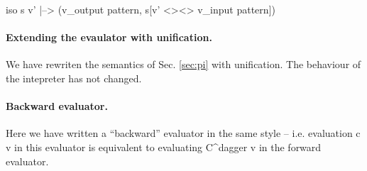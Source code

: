 \documentclass[preprint]{sigplanconf}
\begin{document}
{{ iso s v' |--> (v_{output pattern}, s[v' <><> v_{input pattern}]) }}


\paragraph{Extending the evaulator with unification.} 
We have rewriten the semantics of Sec. \ref{sec:pi} with
unification. The behaviour of the intepreter has not changed.


\paragraph{Backward evaluator.}
Here we have written a ``backward'' evaluator in the same style --
i.e. evaluation {{c v}} in this evaluator is equivalent to evaluating
{{C^{dagger} v}} in the forward evaluator.

\end{document}

